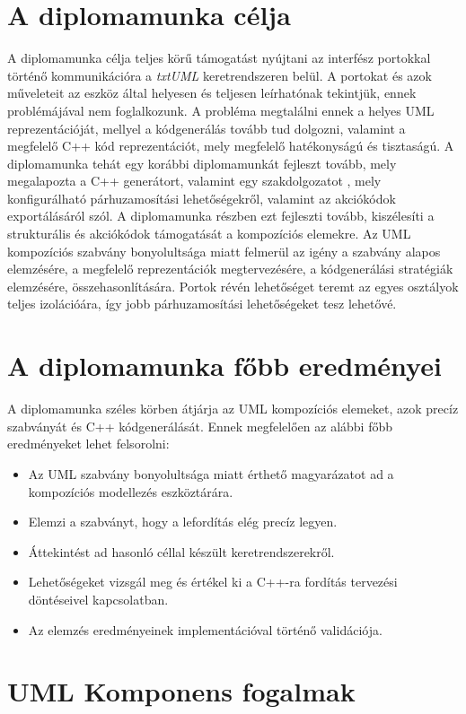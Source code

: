 \documentclass[a4paper,12pt]{report}
\begin{document}
\section{A diplomamunka célja}
A diplomamunka célja teljes körű támogatást nyújtani az interfész portokkal történő kommunikációra a \textit{txtUML} keretrendszeren belül. A portokat és azok műveleteit az eszköz által helyesen és teljesen leírhatónak tekintjük, ennek problémájával nem foglalkozunk. A probléma megtalálni ennek a helyes UML reprezentációját, mellyel a kódgenerálás tovább tud dolgozni, valamint a megfelelő C++ kód reprezentációt, mely megfelelő hatékonyságú és tisztaságú. A diplomamunka tehát egy korábbi diplomamunkát fejleszt tovább\cite{hack_dip}, mely megalapozta a C++ generátort, valamint egy szakdolgozatot \cite{my_szakdolg}, mely konfigurálható párhuzamosítási lehetőségekről, valamint az akciókódok exportálásáról szól. A diplomamunka részben ezt fejleszti tovább, kiszélesíti a strukturális és akciókódok támogatását a kompozíciós elemekre. Az UML kompozíciós szabvány bonyolultsága miatt felmerül az igény a szabvány alapos elemzésére, a megfelelő reprezentációk megtervezésére, a kódgenerálási stratégiák elemzésére, összehasonlítására. Portok révén lehetőséget teremt az egyes osztályok teljes izolációára, így jobb párhuzamosítási lehetőségeket tesz lehetővé.

\section{A diplomamunka főbb eredményei}
A diplomamunka széles körben átjárja az UML kompozíciós elemeket, azok precíz szabványát és C++ kódgenerálását. Ennek megfelelően az alábbi főbb eredményeket lehet felsorolni:
\begin{itemize}
\item Az UML szabvány bonyolultsága miatt érthető magyarázatot ad a kompozíciós modellezés eszköztárára.
\item Elemzi a szabványt, hogy a lefordítás elég precíz legyen.
\item Áttekintést ad hasonló céllal készült keretrendszerekről.
\item Lehetőségeket vizsgál meg és értékel ki a C++-ra fordítás tervezési döntéseivel kapcsolatban.
\item Az elemzés eredményeinek implementációval történő validációja.
\end{itemize}

\section{UML Komponens fogalmak}
\end{document}
